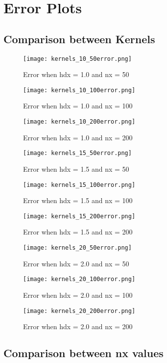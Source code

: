 \documentclass[12pt, a4paper]{report}
\begin{document}
\chapter{Error Plots}
\section{Comparison between Kernels}
\begin{center}
\begin{figure}[H]
	\texttt{[image: kernels\_10\_50error.png]}
	\caption{Error when hdx = 1.0 and nx = 50}
\end{figure}
\begin{figure}[H]
	\texttt{[image: kernels\_10\_100error.png]}
	\caption{Error when hdx = 1.0 and nx = 100}
\end{figure}
\begin{figure}[H]
	\texttt{[image: kernels\_10\_200error.png]}
	\caption{Error when hdx = 1.0 and nx = 200}
\end{figure}
\begin{figure}[H]
	\texttt{[image: kernels\_15\_50error.png]}
	\caption{Error when hdx = 1.5 and nx = 50}
\end{figure}
\begin{figure}[H]
	\texttt{[image: kernels\_15\_100error.png]}
	\caption{Error when hdx = 1.5 and nx = 100}
\end{figure}
\begin{figure}[H]
	\texttt{[image: kernels\_15\_200error.png]}
	\caption{Error when hdx = 1.5 and nx = 200}
\end{figure}
\begin{figure}[H]
	\texttt{[image: kernels\_20\_50error.png]}
	\caption{Error when hdx = 2.0 and nx = 50}
\end{figure}
\begin{figure}[H]
	\texttt{[image: kernels\_20\_100error.png]}
	\caption{Error when hdx = 2.0 and nx = 100}
\end{figure}
\begin{figure}[H]
	\texttt{[image: kernels\_20\_200error.png]}
	\caption{Error when hdx = 2.0 and nx = 200}
\end{figure}
\end{center}

\section{Comparison between nx values}
\end{document}
